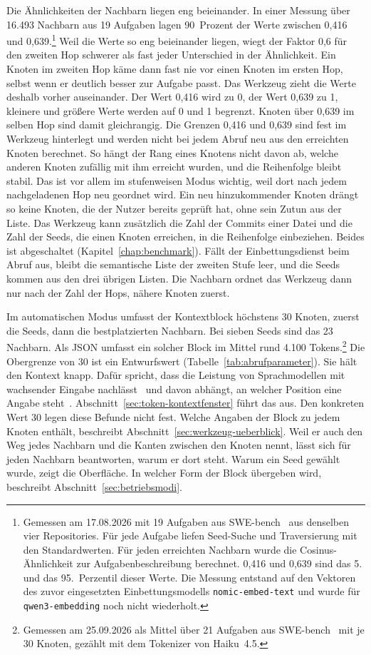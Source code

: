 Die Ähnlichkeiten der Nachbarn liegen eng beieinander. In einer Messung über 16.493 Nachbarn aus 19 Aufgaben lagen 90~Prozent der Werte zwischen 0,416 und 0,639.\footnote{Gemessen am 17.08.2026 mit 19 Aufgaben aus SWE-bench~\parencite{jimenez2024swebench} aus denselben vier Repositories. Für jede Aufgabe liefen Seed-Suche und Traversierung mit den Standardwerten. Für jeden erreichten Nachbarn wurde die Cosinus-Ähnlichkeit zur Aufgabenbeschreibung berechnet. 0,416 und 0,639 sind das 5. und das 95.~Perzentil dieser Werte. Die Messung entstand auf den Vektoren des zuvor eingesetzten Einbettungsmodells \texttt{nomic-embed-text} und wurde für \texttt{qwen3-embedding} noch nicht wiederholt.} Weil die Werte so eng beieinander liegen, wiegt der Faktor 0,6 für den zweiten Hop schwerer als fast jeder Unterschied in der Ähnlichkeit. Ein Knoten im zweiten Hop käme dann fast nie vor einen Knoten im ersten Hop, selbst wenn er deutlich besser zur Aufgabe passt. Das Werkzeug zieht die Werte deshalb vorher auseinander. Der Wert 0,416 wird zu 0, der Wert 0,639 zu 1, kleinere und größere Werte werden auf 0 und 1 begrenzt. Knoten über 0,639 im selben Hop sind damit gleichrangig. Die Grenzen 0,416 und 0,639 sind fest im Werkzeug hinterlegt und werden nicht bei jedem Abruf neu aus den erreichten Knoten berechnet. So hängt der Rang eines Knotens nicht davon ab, welche anderen Knoten zufällig mit ihm erreicht wurden, und die Reihenfolge bleibt stabil. Das ist vor allem im stufenweisen Modus wichtig, weil dort nach jedem nachgeladenen Hop neu geordnet wird. Ein neu hinzukommender Knoten drängt so keine Knoten, die der Nutzer bereits geprüft hat, ohne sein Zutun aus der Liste. Das Werkzeug kann zusätzlich die Zahl der Commits einer Datei und die Zahl der Seeds, die einen Knoten erreichen, in die Reihenfolge einbeziehen. Beides ist abgeschaltet (Kapitel~\ref{chap:benchmark}). Fällt der Einbettungsdienst beim Abruf aus, bleibt die semantische Liste der zweiten Stufe leer, und die Seeds kommen aus den drei übrigen Listen. Die Nachbarn ordnet das Werkzeug dann nur nach der Zahl der Hops, nähere Knoten zuerst.

Im automatischen Modus umfasst der Kontextblock höchstens 30 Knoten, zuerst die Seeds, dann die bestplatzierten Nachbarn. Bei sieben Seeds sind das 23 Nachbarn. Als JSON umfasst ein solcher Block im Mittel rund 4.100 Tokens.\footnote{Gemessen am 25.09.2026 als Mittel über 21 Aufgaben aus SWE-bench~\parencite{jimenez2024swebench} mit je 30 Knoten, gezählt mit dem Tokenizer von Haiku~4.5.} Die Obergrenze von 30 ist ein Entwurfswert (Tabelle~\ref{tab:abrufparameter}). Sie hält den Kontext knapp. Dafür spricht, dass die Leistung von Sprachmodellen mit wachsender Eingabe nachlässt~\parencite{du2025contextlength} und davon abhängt, an welcher Position eine Angabe steht~\parencite{liu2023lostmiddle}. Abschnitt~\ref{sec:token-kontextfenster} führt das aus. Den konkreten Wert 30 legen diese Befunde nicht fest. Welche Angaben der Block zu jedem Knoten enthält, beschreibt Abschnitt~\ref{sec:werkzeug-ueberblick}. Weil er auch den Weg jedes Nachbarn und die Kanten zwischen den Knoten nennt, lässt sich für jeden Nachbarn beantworten, warum er dort steht. Warum ein Seed gewählt wurde, zeigt die Oberfläche. In welcher Form der Block übergeben wird, beschreibt Abschnitt~\ref{sec:betriebsmodi}.

